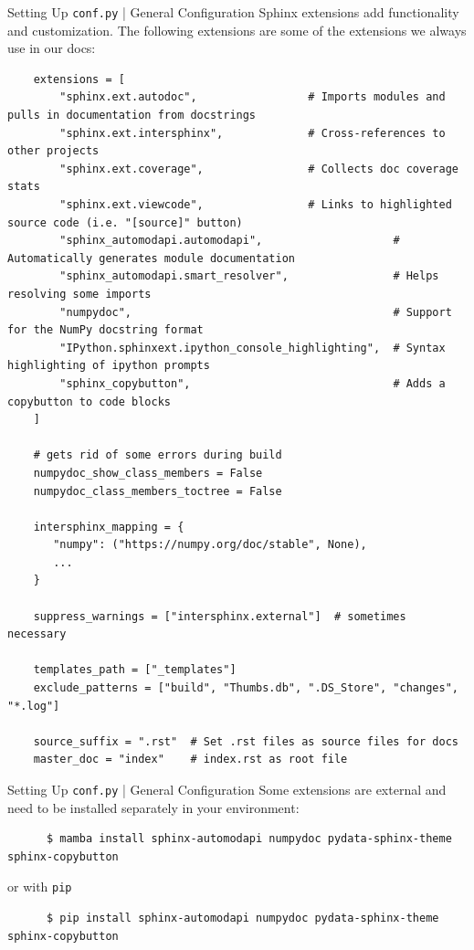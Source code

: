 \begin{frame}[fragile]{Setting Up \texttt{conf.py} | General Configuration}
  Sphinx extensions add functionality and customization. The following extensions
  are some of the extensions we always use in our docs:
  {
  \footnotesize
  \begin{verbatim}
    extensions = [
        "sphinx.ext.autodoc",                 # Imports modules and pulls in documentation from docstrings
        "sphinx.ext.intersphinx",             # Cross-references to other projects
        "sphinx.ext.coverage",                # Collects doc coverage stats
        "sphinx.ext.viewcode",                # Links to highlighted source code (i.e. "[source]" button)
        "sphinx_automodapi.automodapi",                    # Automatically generates module documentation
        "sphinx_automodapi.smart_resolver",                # Helps resolving some imports
        "numpydoc",                                        # Support for the NumPy docstring format
        "IPython.sphinxext.ipython_console_highlighting",  # Syntax highlighting of ipython prompts
        "sphinx_copybutton",                               # Adds a copybutton to code blocks
    ]

    # gets rid of some errors during build
    numpydoc_show_class_members = False
    numpydoc_class_members_toctree = False

    intersphinx_mapping = {
       "numpy": ("https://numpy.org/doc/stable", None),
       ...
    }

    suppress_warnings = ["intersphinx.external"]  # sometimes necessary

    templates_path = ["_templates"]
    exclude_patterns = ["build", "Thumbs.db", ".DS_Store", "changes", "*.log"]

    source_suffix = ".rst"  # Set .rst files as source files for docs
    master_doc = "index"    # index.rst as root file
  \end{verbatim}
  }
\end{frame}


\begin{frame}[fragile]{Setting Up \texttt{conf.py} | General Configuration}
    Some extensions are external and need to be installed separately in your environment:
    \begin{verbatim}
      $ mamba install sphinx-automodapi numpydoc pydata-sphinx-theme sphinx-copybutton
    \end{verbatim}
    or with \texttt{pip}
    \begin{verbatim}
      $ pip install sphinx-automodapi numpydoc pydata-sphinx-theme sphinx-copybutton
    \end{verbatim}
\end{frame}


